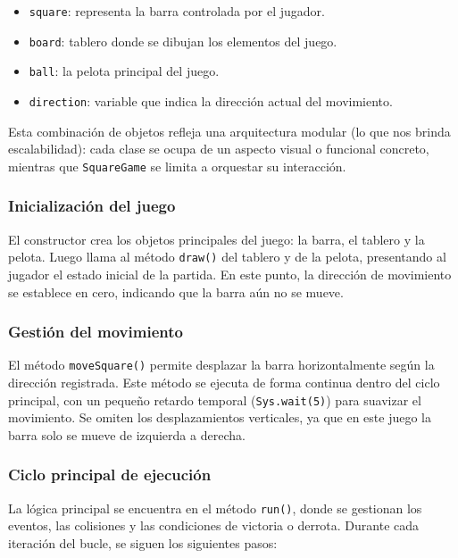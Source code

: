 \documentclass[twocolumn]{article}
\begin{document}
	\begin{itemize}
		\item \texttt{square}: representa la barra controlada por el jugador.
		\item \texttt{board}: tablero donde se dibujan los elementos del juego.
		\item \texttt{ball}: la pelota principal del juego.
		\item \texttt{direction}: variable que indica la dirección actual del movimiento.
	\end{itemize}
	
	Esta combinación de objetos refleja una arquitectura modular (lo que nos brinda escalabilidad): cada clase se ocupa de un aspecto visual o funcional concreto, mientras que \texttt{SquareGame} se limita a orquestar su interacción.
	
	\subsubsection{Inicialización del juego}
	El constructor crea los objetos principales del juego: la barra, el tablero y la pelota. Luego llama al método \texttt{draw()} del tablero y de la pelota, presentando al jugador el estado inicial de la partida.  
	En este punto, la dirección de movimiento se establece en cero, indicando que la barra aún no se mueve.
	
	\subsubsection{Gestión del movimiento}
	El método \texttt{moveSquare()} permite desplazar la barra horizontalmente según la dirección registrada. Este método se ejecuta de forma continua dentro del ciclo principal, con un pequeño retardo temporal (\texttt{Sys.wait(5)}) para suavizar el movimiento.  
	Se omiten los desplazamientos verticales, ya que en este juego la barra solo se mueve de izquierda a derecha.
	
	\subsubsection{Ciclo principal de ejecución}
	La lógica principal se encuentra en el método \texttt{run()}, donde se gestionan los eventos, las colisiones y las condiciones de victoria o derrota.  
	Durante cada iteración del bucle, se siguen los siguientes pasos:
	
\end{document}
